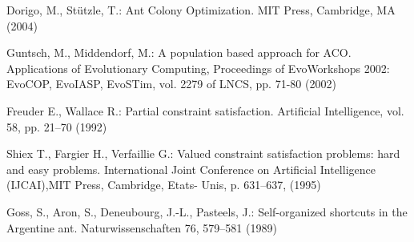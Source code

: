 \documentclass{llncs}
\begin{document}
\begin{thebibliography}{1}
	 Dorigo, M., Stützle, T.: 
	 Ant Colony Optimization. 
	 MIT Press, Cambridge, MA (2004)
	 
	 Guntsch, M., Middendorf, M.:
	 A population based approach for ACO.
	 Applications of Evolutionary Computing, Proceedings of EvoWorkshops 2002:
	 EvoCOP, EvoIASP, EvoSTim, vol. 2279 of LNCS, pp. 71-80 (2002)
      
	  Freuder E., Wallace R.: 
	  Partial constraint satisfaction.
	  Artificial Intelligence, vol. 58, pp. 21–70 (1992)
	  
	 Shiex T., Fargier H., Verfaillie G.:
	 Valued constraint satisfaction problems: hard and easy problems. 
	 International Joint Conference on Artificial Intelligence (IJCAI),MIT Press, Cambridge, Etats-
	 Unis, p. 631–637, (1995)
	
	 Goss, S., Aron, S., Deneubourg, J.-L., Pasteels, J.: 
	 Self-organized shortcuts in the Argentine ant. 
	 Naturwissenschaften 76, 579–581 (1989)
      
      
  \end{thebibliography}
\end{document}
